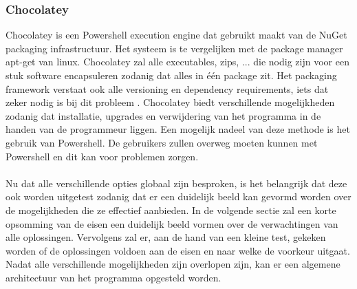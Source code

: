 \documentclass{article}
\begin{document}
\subsubsection{Chocolatey \citep{chocoMain}}
Chocolatey is een Powershell execution engine dat gebruikt maakt van de NuGet packaging infrastructuur.
Het systeem is te vergelijken met de package manager apt-get van linux.
Chocolatey zal alle executables, zips, ... die nodig zijn voor een stuk software encapsuleren zodanig dat alles in \'e\'en package zit.
Het packaging framework verstaat ook alle versioning en dependency requirements, iets dat zeker nodig is bij dit probleem \citep{chocoDoc}.
Chocolatey biedt verschillende mogelijkheden zodanig dat installatie, upgrades en verwijdering van het programma in de handen van de programmeur liggen.
Een mogelijk nadeel van deze methode is het gebruik van Powershell. 
De gebruikers zullen overweg moeten kunnen met Powershell en dit kan voor problemen zorgen. 

\paragraph{}
Nu dat alle verschillende opties globaal zijn besproken, is het belangrijk dat deze ook worden uitgetest zodanig dat er een duidelijk beeld kan gevormd worden over de mogelijkheden die ze effectief aanbieden.
In de volgende sectie zal een korte opsomming van de eisen een duidelijk beeld vormen over de verwachtingen van alle oplossingen.
Vervolgens zal er, aan de hand van een kleine test, gekeken worden of de oplossingen voldoen aan de eisen en naar welke de voorkeur uitgaat.
Nadat alle verschillende mogelijkheden zijn overlopen zijn, kan er een algemene architectuur van het programma opgesteld worden.
\end{document}

